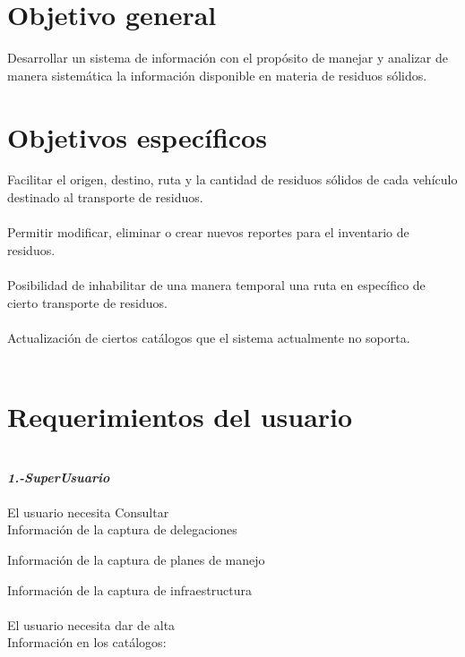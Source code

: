 
\section{Objetivo general}
Desarrollar un sistema de información con el propósito de manejar y analizar de manera sistemática la información disponible en materia de residuos sólidos.

\section{Objetivos específicos}

\textbullet Facilitar el origen, destino, ruta y la cantidad de residuos sólidos de cada vehículo destinado al transporte de residuos.\\\\
\textbullet Permitir modificar, eliminar o crear nuevos reportes para el inventario de residuos.\\\\
\textbullet Posibilidad de inhabilitar de una manera temporal una ruta en específico de cierto transporte de residuos.\\\\
\textbullet Actualización de  ciertos catálogos que el sistema actualmente no soporta.\\\\

\section{Requerimientos del usuario}
{\large \textit{\textbf{\\1.-SuperUsuario}}}\\\\
\textbullet El usuario necesita Consultar \\

\textbullet Información de la captura de delegaciones

\textbullet Información de la captura de planes de manejo

\textbullet Información de la captura de infraestructura\\\\
\textbullet El usuario necesita dar de alta\\

\textbullet Información en los catálogos:

